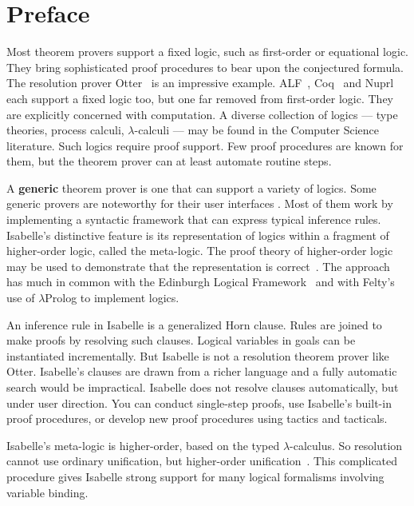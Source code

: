 \chapter*{Preface}


Most theorem provers support a fixed logic, such as first-order or
equational logic.  They bring sophisticated proof procedures to bear upon
the conjectured formula.  The resolution prover Otter~\cite{wos-bledsoe} is
an impressive example.  ALF~\cite{alf}, Coq~\cite{coq} and
Nuprl~\cite{constable86} each support a fixed logic too, but one far
removed from first-order logic.  They are explicitly concerned with
computation.  A diverse collection of logics --- type theories, process
calculi, $\lambda$-calculi --- may be found in the Computer Science
literature.  Such logics require proof support.  Few proof procedures are
known for them, but the theorem prover can at least automate routine steps.

A {\bf generic} theorem prover is one that can support a variety of logics.
Some generic provers are noteworthy for their user interfaces
\cite{dawson90,mural,sawamura92}.  Most of them work by implementing a
syntactic framework that can express typical inference rules.  Isabelle's
distinctive feature is its representation of logics within a fragment of
higher-order logic, called the meta-logic.  The proof theory of
higher-order logic may be used to demonstrate that the representation is
correct~\cite{paulson89}.  The approach has much in common with the
Edinburgh Logical Framework~\cite{harper-jacm} and with
Felty's~\cite{felty93} use of $\lambda$Prolog to implement logics.

An inference rule in Isabelle is a generalized Horn clause.  Rules are
joined to make proofs by resolving such clauses.  Logical variables in
goals can be instantiated incrementally.  But Isabelle is not a resolution
theorem prover like Otter.  Isabelle's clauses are drawn from a richer
language and a fully automatic search would be impractical.  Isabelle does
not resolve clauses automatically, but under user direction.  You can
conduct single-step proofs, use Isabelle's built-in proof procedures, or
develop new proof procedures using tactics and tacticals.

Isabelle's meta-logic is higher-order, based on the typed
$\lambda$-calculus.  So resolution cannot use ordinary unification, but
higher-order unification~\cite{huet75}.  This complicated procedure gives
Isabelle strong support for many logical formalisms involving variable
binding.

